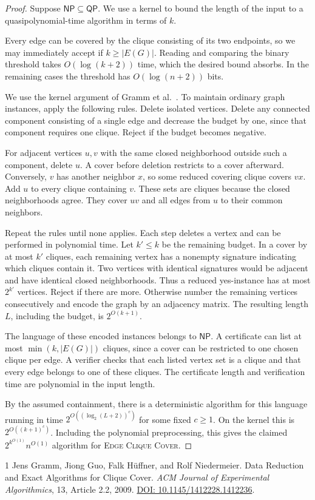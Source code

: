 \documentclass[11pt]{article}
\begin{document}
\begin{proof}
Suppose \(\mathsf{NP}\subseteq\mathsf{QP}\). We use a kernel to bound the
length of the input to a quasipolynomial-time algorithm in terms of \(k\).

Every edge can be covered by the clique consisting of its two endpoints,
so we may immediately accept if \(k\geq |E(G)|\). Reading and comparing
the binary threshold takes \(O(\log(k+2))\) time, which the desired bound
absorbs. In the remaining cases the threshold has \(O(\log(n+2))\) bits.

We use the kernel argument of Gramm et al.~\cite[Section 2,
Rules 1 and \(3'\), Theorem 1]{gramm}. To maintain ordinary graph
instances, apply the following rules. Delete isolated vertices.
Delete any connected component consisting of a single edge and
decrease the budget by one, since that component requires one
clique. Reject if the budget becomes negative.

For adjacent vertices \(u,v\) with the same closed neighborhood
outside such a component, delete \(u\). A cover before deletion
restricts to a cover afterward. Conversely, \(v\) has another
neighbor \(x\), so some reduced covering clique covers \(vx\).
Add \(u\) to every clique containing \(v\). These sets are cliques
because the closed neighborhoods agree. They cover \(uv\) and
all edges from \(u\) to their common neighbors.

Repeat the rules until none applies. Each step deletes a vertex
and can be performed in polynomial time. Let \(k'\leq k\) be the
remaining budget. In a cover by at most \(k'\) cliques, each
remaining vertex has a nonempty signature indicating which cliques
contain it. Two vertices with identical signatures would be
adjacent and have identical closed neighborhoods. Thus a reduced
yes-instance has at most \(2^{k'}\) vertices. Reject if there are
more. Otherwise number the remaining vertices consecutively and
encode the graph by an adjacency matrix. The resulting length \(L\), including the budget, is
\(2^{O(k+1)}\).

The language of these encoded instances belongs to \(\mathsf{NP}\).
A certificate can list at most \(\min(k,|E(G)|)\) cliques, since a cover
can be restricted to one chosen clique per edge. A verifier checks that
each listed vertex set is a clique and that every edge belongs to one
of these cliques. The certificate length and verification time are
polynomial in the input length.

By the assumed containment, there is a deterministic algorithm for
this language running in time \(2^{O((\log_2(L+2))^c)}\) for some fixed
\(c\geq 1\). On the kernel this is \(2^{O((k+1)^c)}\).
Including the polynomial preprocessing, this gives the claimed
\(2^{k^{O(1)}}n^{O(1)}\) algorithm for \textsc{Edge Clique Cover}.
\end{proof}

\begin{thebibliography}{1}
Jens Gramm, Jiong Guo, Falk H\"uffner, and Rolf Niedermeier.
\newblock Data Reduction and Exact Algorithms for Clique Cover.
\newblock \emph{ACM Journal of Experimental Algorithmics}, 13,
Article 2.2, 2009.
\newblock \href{https://doi.org/10.1145/1412228.1412236}{DOI: 10.1145/1412228.1412236}.
\end{thebibliography}
\end{document}
